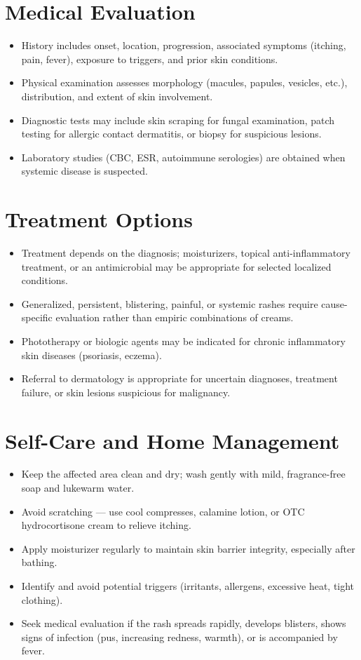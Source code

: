 \section*{Medical Evaluation}
\begin{itemize}
  \item History includes onset, location, progression, associated symptoms (itching, pain, fever), exposure to triggers, and prior skin conditions.
  \item Physical examination assesses morphology (macules, papules, vesicles, etc.), distribution, and extent of skin involvement.
  \item Diagnostic tests may include skin scraping for fungal examination, patch testing for allergic contact dermatitis, or biopsy for suspicious lesions.
  \item Laboratory studies (CBC, ESR, autoimmune serologies) are obtained when systemic disease is suspected.
\end{itemize}

\section*{Treatment Options}
\begin{itemize}
  \item Treatment depends on the diagnosis; moisturizers, topical anti-inflammatory treatment, or an antimicrobial may be appropriate for selected localized conditions.
  \item Generalized, persistent, blistering, painful, or systemic rashes require cause-specific evaluation rather than empiric combinations of creams.
  \item Phototherapy or biologic agents may be indicated for chronic inflammatory skin diseases (psoriasis, eczema).
  \item Referral to dermatology is appropriate for uncertain diagnoses, treatment failure, or skin lesions suspicious for malignancy.
\end{itemize}

\section*{Self-Care and Home Management}
\begin{itemize}
  \item Keep the affected area clean and dry; wash gently with mild, fragrance-free soap and lukewarm water.
  \item Avoid scratching — use cool compresses, calamine lotion, or OTC hydrocortisone cream to relieve itching.
  \item Apply moisturizer regularly to maintain skin barrier integrity, especially after bathing.
  \item Identify and avoid potential triggers (irritants, allergens, excessive heat, tight clothing).
  \item Seek medical evaluation if the rash spreads rapidly, develops blisters, shows signs of infection (pus, increasing redness, warmth), or is accompanied by fever.
\end{itemize}

